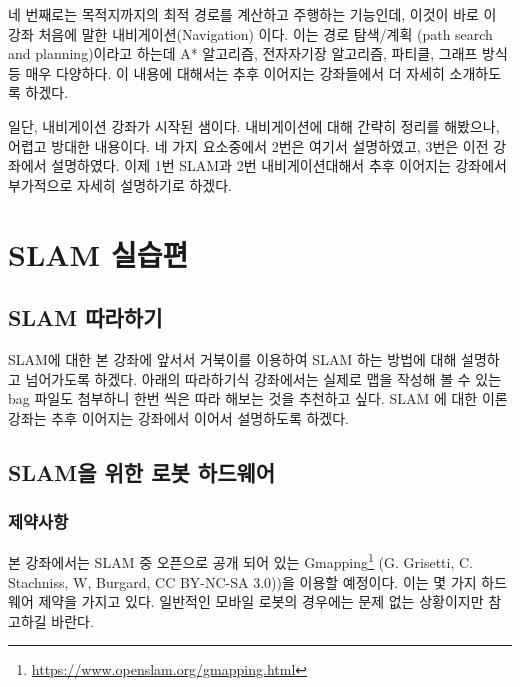 네 번째로는 목적지까지의 최적 경로를 계산하고 주행하는 기능인데, 이것이 바로 이 강좌 처음에 말한 내비게이션(Navigation) 이다. 이는 경로 탐색/계획  (path search and planning)이라고 하는데 A* 알고리즘, 전자자기장 알고리즘, 파티클, 그래프 방식 등 매우 다양하다. 이 내용에 대해서는 추후 이어지는 강좌들에서 더 자세히 소개하도록 하겠다.

일단, 내비게이션 강좌가 시작된 샘이다. 내비게이션에 대해 간략히 정리를 해봤으나, 어렵고 방대한 내용이다. 네 가지 요소중에서 2번은 여기서 설명하였고, 3번은 이전 강좌에서 설명하였다. 이제 1번 SLAM과 2번 내비게이션대해서 추후 이어지는 강좌에서 부가적으로 자세히 설명하기로 하겠다.

\section{SLAM 실습편}
\label{sec:SlamExe}

\subsection{SLAM 따라하기}

SLAM에 대한 본 강좌에 앞서서 거북이를 이용하여 SLAM 하는 방법에 대해 설명하고 넘어가도록 하겠다. 아래의 따라하기식 강좌에서는 실제로 맵을 작성해 볼 수 있는 bag 파일도 첨부하니 한번 씩은 따라 해보는 것을 추천하고 싶다. SLAM 에 대한 이론 강좌는 추후 이어지는 강좌에서 이어서 설명하도록 하겠다.

\subsection{SLAM을 위한 로봇 하드웨어}

\subsubsection{제약사항}

본 강좌에서는 SLAM 중 오픈으로 공개 되어 있는 Gmapping\footnote{\url{https://www.openslam.org/gmapping.html}} (G. Grisetti, C. Stachniss, W, Burgard, CC BY-NC-SA 3.0))을 이용할 예정이다. 이는 몇 가지 하드웨어 제약을 가지고 있다. 일반적인 모바일 로봇의 경우에는 문제 없는 상황이지만 참고하길 바란다.


